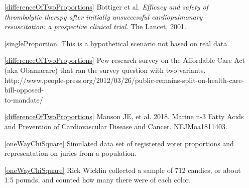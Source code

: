 \begin{itemize}
\item[\ref{differenceOfTwoProportions}]
    B$\ddot{\text{o}}$ttiger et al.
    \emph{Efficacy and safety of thrombolytic therapy after
        initially unsuccessful cardiopulmonary resuscitation:
        a prospective clinical trial}.
        The Lancet, 2001.

\item[\ref{singleProportion}]
    This is a hypothetical scenario not based on real data.

\item[\ref{differenceOfTwoProportions}]
    Pew research survey on the Affordable Care Act (aka Obamacare)
    that ran the survey question with two variants.\\
        {http://www.people-press.org/2012/03/26/public-remains-split-on-health-care-bill-opposed-\\
        to-mandate/}

\item[\ref{differenceOfTwoProportions}]
    Manson JE, et al. 2018.
    Marine n-3 Fatty Acids and Prevention of
    Cardiovascular Disease and Cancer. NEJMoa1811403.



\item[\ref{oneWayChiSquare}]
    Simulated data set of registered voter proportions
    and representation on juries from a population.

\item[\ref{oneWayChiSquare}]
    Rick Wicklin collected a sample of 712 candies, or about 1.5 pounds,
    and counted how many there were of each color.   \\


\end{itemize}
